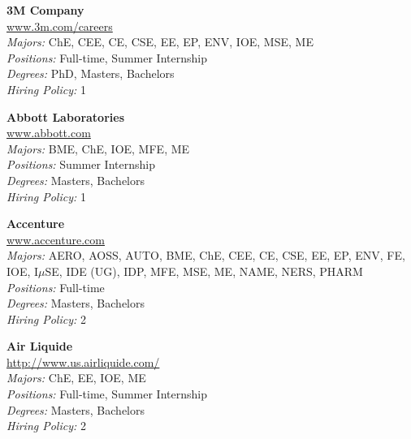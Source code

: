 \documentclass{article}
\begin{document}
\begin{center}\begin{multicols}{3}
\begin{minipage}{.9\columnwidth}{\Large\bf 3M Company }\\
	\url{www.3m.com/careers}\\
	\emph{Majors:} ChE, CEE, CE, CSE, EE, EP, ENV, IOE, MSE, ME\\
	\emph{Positions:} Full-time, Summer Internship\\
	\emph{Degrees:} PhD, Masters, Bachelors\\
	\emph{Hiring Policy:} 1\\
\end{minipage}
 
\begin{minipage}{.9\columnwidth}{\Large\bf Abbott Laboratories }\\
	\url{www.abbott.com}\\
	\emph{Majors:} BME, ChE, IOE, MFE, ME\\
	\emph{Positions:} Summer Internship\\
	\emph{Degrees:} Masters, Bachelors\\
	\emph{Hiring Policy:} 1\\
\end{minipage}
 
\begin{minipage}{.9\columnwidth}{\Large\bf Accenture }\\
	\url{www.accenture.com}\\
	\emph{Majors:} AERO, AOSS, AUTO, BME, ChE, CEE, CE, CSE, EE, EP, ENV, FE, IOE, I$\mu$SE, IDE (UG), IDP, MFE, MSE, ME, NAME, NERS, PHARM\\
	\emph{Positions:} Full-time\\
	\emph{Degrees:} Masters, Bachelors\\
	\emph{Hiring Policy:} 2\\
\end{minipage}
 
\begin{minipage}{.9\columnwidth}{\Large\bf Air Liquide }\\
	\url{http://www.us.airliquide.com/}\\
	\emph{Majors:} ChE, EE, IOE, ME\\
	\emph{Positions:} Full-time, Summer Internship\\
	\emph{Degrees:} Masters, Bachelors\\
	\emph{Hiring Policy:} 2\\
\end{minipage}
 

\end{multicols}
\end{center}
\end{document}
